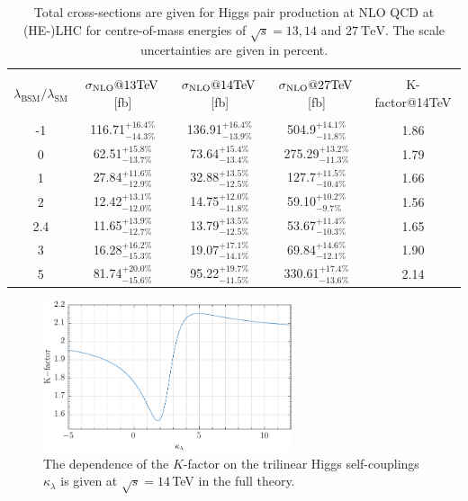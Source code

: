 \documentclass[a4paper]{jpconf}
\newcommand{\TeV}{\ensuremath{\mathrm{\:TeV}}}
\newcommand{\chhh}{\ensuremath{\kappa_{\lambda}}}
\begin{document}
\begin{table}[htb!]
\begin{center}
\begin{tabular}{| c | c | c |c|c|}
\hline
&&&&\\
$\lambda_{\mathrm{BSM}}/\lambda_{\mathrm{SM}}$ & $\sigma_{\rm{NLO}}@13 \mathrm{TeV}$\,[fb]& $\sigma_{\rm{NLO}}@14 \mathrm{TeV}$\,[fb] & $\sigma_{\rm{NLO}}@27 \mathrm{TeV}$\,[fb] &K-factor@14TeV\\
&&&&\\
\hline
-1& 116.71$^{+16.4\%}_{-14.3\%}$  & 136.91$^{+16.4\%}_{-13.9\%}$& 504.9$^{+14.1\%}_{-11.8\%}$ & 1.86 \\
\hline
0& 62.51$^{+15.8\%}_{-13.7\%}$ & 73.64$^{+15.4\%}_{-13.4\%}$& 275.29$^{+13.2\%}_{-11.3\%}$& 1.79  \\
\hline 
1& 27.84$^{+11.6\%}_{-12.9\%}$ & 32.88$^{+13.5\%}_{-12.5\%}$&127.7$^{+11.5\%}_{-10.4\%}$ &1.66\\
\hline
2 & 12.42$^{+13.1\%}_{-12.0\%}$ & 14.75$^{+12.0\%}_{-11.8\%}$ &  59.10$^{+10.2\%}_{-9.7\%}$ & 1.56 \\
\hline
2.4& 11.65$^{+13.9\%}_{-12.7\%}$ & 13.79$^{+13.5\%}_{-12.5\%}$& 53.67$^{+11.4\%}_{-10.3\%}$ & 1.65 \\
\hline
3& 16.28$^{+16.2\%}_{-15.3\%}$ & 19.07$^{+17.1\%}_{-14.1\%}$ & 69.84$^{+14.6\%}_{-12.1\%}$ & 1.90 \\
\hline 
5& 81.74$^{+20.0\%}_{-15.6\%}$  & 95.22$^{+19.7\%}_{-11.5\%}$& 330.61$^{+17.4\%}_{-13.6\%}$ & 2.14 \\
\hline 
\end{tabular}
\end{center}
\caption{Total cross-sections are given for Higgs pair production at NLO QCD at (HE-)LHC for centre-of-mass energies of $\sqrt{s}=13,14$ and $27 \TeV$. The scale uncertainties are given in percent.
\label{tab:sigmatot}}
\end{table}

\begin{figure}[htb!]
  \centering
    \includegraphics[width=0.65\textwidth]{figures/Kfactor.pdf}
\caption{The dependence of the $K$-factor on the trilinear Higgs self-couplings $\chhh$ is given at $\sqrt{s}=14$\,TeV in the full theory.}
\label{fig:Kfacvariation}
\end{figure}
\end{document}
